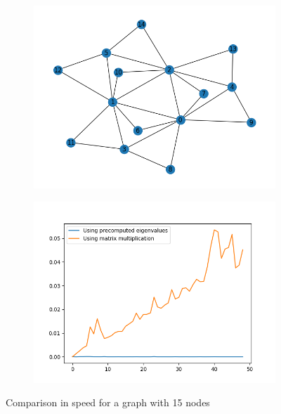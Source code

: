 \documentclass[12pt, a4paper]{article}
\begin{document}
\begin{flushleft}
    \begin{figure}
      \centering
      \begin{subfigure}{0.49\textwidth}
        \centering
    \includegraphics[width=1\textwidth]{15nodesgraph}
      \end{subfigure}
      \begin{subfigure}{0.49\textwidth}
        \centering
    \includegraphics[width=1\textwidth]{15nodesoutput}
      \end{subfigure}
    \caption{Comparison in speed for a graph with 15 nodes}
    \end{figure}


\end{flushleft}
\end{document}
